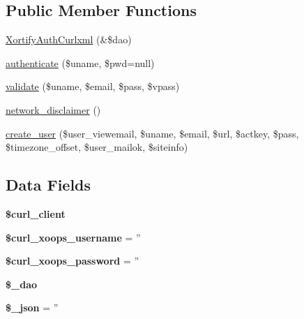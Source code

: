 \subsection*{Public Member Functions}
\begin{DoxyCompactItemize}
\item 
\hyperlink{class_xortify_auth_curlxml_a13dd1fcc61eefac807467f1ae7a9e2a6}{Xortify\-Auth\-Curlxml} (\&\$dao)
\item 
\hyperlink{class_xortify_auth_curlxml_a00678ba307326b734e6c679f28bea315}{authenticate} (\$uname, \$pwd=null)
\item 
\hyperlink{class_xortify_auth_curlxml_a91121a1b702dfd20fb65a027c8ed26ec}{validate} (\$uname, \$email, \$pass, \$vpass)
\item 
\hyperlink{class_xortify_auth_curlxml_a1874c27b6f81a3f2ff9015405ad0f8bc}{network\-\_\-disclaimer} ()
\item 
\hyperlink{class_xortify_auth_curlxml_ac72efc5ad313a592cf6706876f56f7ec}{create\-\_\-user} (\$user\-\_\-viewemail, \$uname, \$email, \$url, \$actkey, \$pass, \$timezone\-\_\-offset, \$user\-\_\-mailok, \$siteinfo)
\end{DoxyCompactItemize}
\subsection*{Data Fields}
\begin{DoxyCompactItemize}
\item 
\hypertarget{class_xortify_auth_curlxml_a402f2112991f3227835af80e9df33e38}{{\bfseries \$curl\-\_\-client}}\label{class_xortify_auth_curlxml_a402f2112991f3227835af80e9df33e38}

\item 
\hypertarget{class_xortify_auth_curlxml_aab7480ba9f878a02b2c9fd43922fa070}{{\bfseries \$curl\-\_\-xoops\-\_\-username} = ''}\label{class_xortify_auth_curlxml_aab7480ba9f878a02b2c9fd43922fa070}

\item 
\hypertarget{class_xortify_auth_curlxml_a6c9851541ed3826c67cfe7224c38f0b8}{{\bfseries \$curl\-\_\-xoops\-\_\-password} = ''}\label{class_xortify_auth_curlxml_a6c9851541ed3826c67cfe7224c38f0b8}

\item 
\hypertarget{class_xortify_auth_curlxml_a12a029c610f699b4b25e79a1f64a3485}{{\bfseries \$\-\_\-dao}}\label{class_xortify_auth_curlxml_a12a029c610f699b4b25e79a1f64a3485}

\item 
\hypertarget{class_xortify_auth_curlxml_a94787b37d92a2dee02534eed4f316589}{{\bfseries \$\-\_\-json} = ''}\label{class_xortify_auth_curlxml_a94787b37d92a2dee02534eed4f316589}

\end{DoxyCompactItemize}


